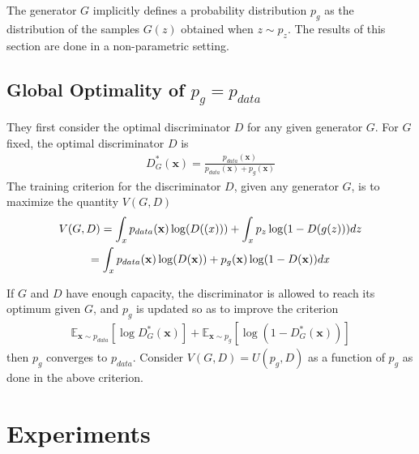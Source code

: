 \documentclass[10pt,twocolumn,letterpaper]{article}
\begin{document}
The generator $G$ implicitly defines a probability distribution $p_g$ as the distribution of the samples $G(z)$ obtained when $z\sim p_z$. The results of this section are done in a non-parametric setting.

\subsection{Global Optimality of $p_g = p_{data}$}

They first consider the optimal discriminator $D$ for any given generator $G$. For $G$ fixed, the optimal discriminator $D$ is~\cite{gg} \\
\begin{gather}
D^{\ast}_G(\mathbf{x}) = \frac{p_{data}(\mathbf{x})}{p_{data}(\mathbf{x}) + p_g(\mathbf{x})}
\end{gather}
The training criterion for the discriminator $D$, given any generator $G$, is to maximize the quantity $V(G,D)$~\cite{gg}\\
\begin{gather}
V(G,D) = \int_xp_{data}(\mathbf{x})\log(D(\mathbf(x))) + \int_xp_z\log(1-D(g(z)))dz\\ \notag =\int_xp_{data}(\mathbf{x})\log(D(\mathbf{x})) + p_g(\mathbf{x})\log(1-D(\mathbf{x}))dx 
\end{gather}

If $G$ and $D$ have enough capacity, the discriminator is allowed to reach its optimum given $G$, and $p_g$ is updated so as to improve the criterion~\cite{gg} \\
\begin{gather}
\mathbb{E}_{\mathbf{x}\sim p_{data}}[\log D_G^{\ast}(\mathbf{x})] + \mathbb{E}_{\mathbf{x}\sim p_g}[\log(1 - D_G^{\ast}(\mathbf{x}))]
\end{gather}
then $p_g$ converges to $p_{data}$. Consider $V(G,D) = U(p_g,D)$ as a function of $p_g$ as done in the above criterion.  

\balance

\section{Experiments}
\end{document}
